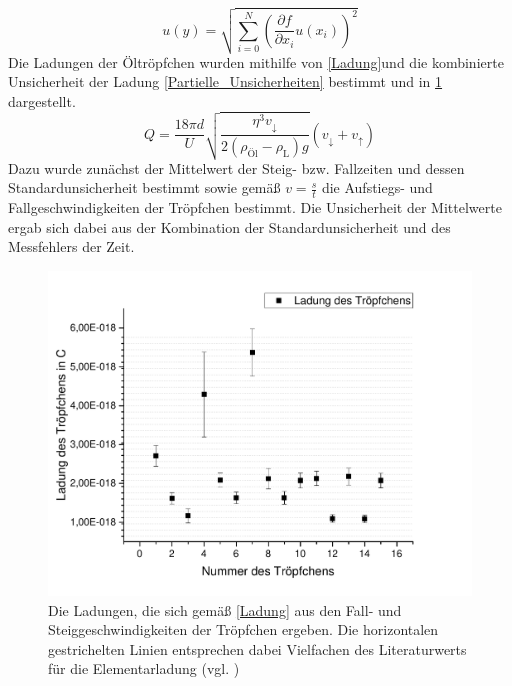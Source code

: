 \documentclass[
	a4paper,
	12pt,
	pagesize,
	ngerman
]{scrartcl}
\begin{document}
	\begin{equation}
	u(y) = \sqrt{  \sum_{i=0}^{N} \left( \frac{\partial f}{\partial x_i}u(x_i)\right)^2  }
	\label{Partielle_Unsicherheiten}
	\end{equation}
	Die Ladungen der Öltröpfchen wurden mithilfe von \cref{Ladung}und die kombinierte Unsicherheit der Ladung \cref{Partielle_Unsicherheiten}  bestimmt und in \cref{Tropf_Ladungen} dargestellt. %
	\begin{equation}
		Q=\frac{18 \pi d}{U} \sqrt{\frac{\eta^3 v_\downarrow}{2(\rho_\text{Öl}-\rho_\text{L})g}}(v_\downarrow + v_\uparrow)
		\label{Ladung}
	\end{equation}
	Dazu wurde zunächst der Mittelwert der Steig- bzw. Fallzeiten und dessen Standardunsicherheit bestimmt sowie gemäß $ v=\frac{s}{t} $ die Aufstiegs- und Fallgeschwindigkeiten der Tröpfchen bestimmt.
	Die Unsicherheit der Mittelwerte ergab sich dabei aus der Kombination der Standardunsicherheit und des Messfehlers der Zeit.
	\begin{figure}[H]
		\includegraphics[width=1\textwidth]{Troepfchenladungen}
		\centering
		\caption{Die Ladungen, die sich gemäß \cref{Ladung} aus den Fall- und Steiggeschwindigkeiten der Tröpfchen ergeben. Die horizontalen gestrichelten Linien entsprechen dabei Vielfachen des Literaturwerts für die Elementarladung (vgl. \cite{Elementarladung})}
		\label{Tropf_Ladungen}
		\centering
	\end{figure} 


\end{document}
